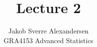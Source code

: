 \documentclass[10pt]{article}
\begin{document}
 
\title{Lecture 2}
\author{Jakob Sverre Alexandersen\\
GRA4153 Advanced Statistics}
\maketitle

\tableofcontents
\newpage
\end{document}
